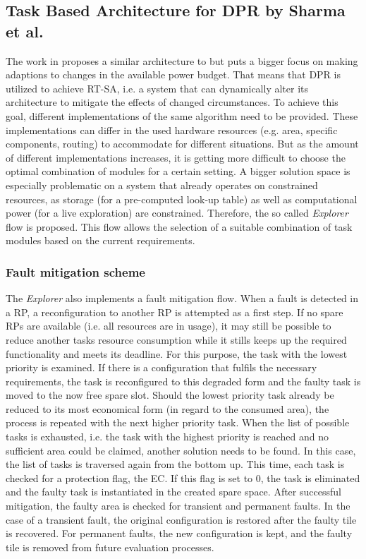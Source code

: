 \subsection{Task Based Architecture for \gls{DPR} by Sharma et al.}\label{sec:TaskBasedArchitectureSharma}
The work in \cite{sharma_run-time_2018} proposes a similar architecture to \cite{wang_dynamic_2018} but puts a bigger focus on making adaptions to changes in the available power budget.
That means that \gls{DPR} is utilized to achieve \gls{RT-SA}, i.e. a system that can dynamically alter its architecture to mitigate the effects of changed circumstances.
To achieve this goal, different implementations of the same algorithm need to be provided.
These implementations can differ in the used hardware resources (e.g. area, specific components, routing) to accommodate for different situations.
But as the amount of different implementations increases, it is getting more difficult to choose the optimal combination of modules for a certain setting.
A bigger solution space is especially problematic on a system that already operates on constrained resources, as storage (for a pre-computed look-up table) as well as computational power (for a live exploration) are constrained. 
Therefore, the so called \textit{Explorer} flow is proposed.
This flow allows the selection of a suitable combination of task modules based on the current requirements.
\subsubsection{Fault mitigation scheme}
The \textit{Explorer} also implements a fault mitigation flow.
When a fault is detected in a \gls{RP}, a reconfiguration to another \gls{RP} is attempted as a first step.
If no spare \glspl{RP} are available (i.e. all resources are in usage), it may still be possible to reduce another tasks resource consumption while it stills keeps up the required functionality and meets its deadline.
For this purpose, the task with the lowest priority is examined.
If there is a configuration that fulfils the necessary requirements, the task is reconfigured to this degraded form and the faulty task is moved to the now free spare slot.
Should the lowest priority task already be reduced to its most economical form (in regard to the consumed area), the process is repeated with the next higher priority task. 
When the list of possible tasks is exhausted, i.e. the task with the highest priority is reached and no sufficient area could be claimed, another solution needs to be found. 
In this case, the list of tasks is traversed again from the bottom up. 
This time, each task is checked for a protection flag, the \gls{EC}. 
If this flag is set to 0, the task is eliminated and the faulty task is instantiated in the created spare space.
After successful mitigation, the faulty area is checked for transient and permanent faults. 
In the case of a transient fault, the original configuration is restored after the faulty tile is recovered. 
For permanent faults, the new configuration is kept, and the faulty tile is removed from future evaluation processes. 
 
